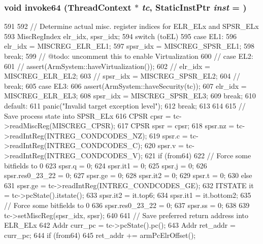 \hypertarget{classArmISA_1_1ArmFault_aaf4d069b2d2cce997ddb00514554ac02}{
\subsubsection[{invoke64}]{\setlength{\rightskip}{0pt plus 5cm}void invoke64 ({\bf ThreadContext} $\ast$ {\em tc}, \/  {\bf StaticInstPtr} {\em inst} = {})}}
\label{classArmISA_1_1ArmFault_aaf4d069b2d2cce997ddb00514554ac02}



\begin{DoxyCode}
591 {
592     // Determine actual misc. register indices for ELR_ELx and SPSR_ELx
593     MiscRegIndex elr_idx, spsr_idx;
594     switch (toEL) {
595       case EL1:
596         elr_idx = MISCREG_ELR_EL1;
597         spsr_idx = MISCREG_SPSR_EL1;
598         break;
599       // @todo: uncomment this to enable Virtualization
600       // case EL2:
601       //   assert(ArmSystem::haveVirtualization());
602       //   elr_idx = MISCREG_ELR_EL2;
603       //   spsr_idx = MISCREG_SPSR_EL2;
604       //   break;
605       case EL3:
606         assert(ArmSystem::haveSecurity(tc));
607         elr_idx = MISCREG_ELR_EL3;
608         spsr_idx = MISCREG_SPSR_EL3;
609         break;
610       default:
611         panic("Invalid target exception level");
612         break;
613     }
614 
615     // Save process state into SPSR_ELx
616     CPSR cpsr = tc->readMiscReg(MISCREG_CPSR);
617     CPSR spsr = cpsr;
618     spsr.nz = tc->readIntReg(INTREG_CONDCODES_NZ);
619     spsr.c = tc->readIntReg(INTREG_CONDCODES_C);
620     spsr.v = tc->readIntReg(INTREG_CONDCODES_V);
621     if (from64) {
622         // Force some bitfields to 0
623         spsr.q = 0;
624         spsr.it1 = 0;
625         spsr.j = 0;
626         spsr.res0_23_22 = 0;
627         spsr.ge = 0;
628         spsr.it2 = 0;
629         spsr.t = 0;
630     } else {
631         spsr.ge = tc->readIntReg(INTREG_CONDCODES_GE);
632         ITSTATE it = tc->pcState().itstate();
633         spsr.it2 = it.top6;
634         spsr.it1 = it.bottom2;
635         // Force some bitfields to 0
636         spsr.res0_23_22 = 0;
637         spsr.ss = 0;
638     }
639     tc->setMiscReg(spsr_idx, spsr);
640 
641     // Save preferred return address into ELR_ELx
642     Addr curr_pc = tc->pcState().pc();
643     Addr ret_addr = curr_pc;
644     if (from64)
645         ret_addr += armPcElrOffset();
}
\end{DoxyCode}

